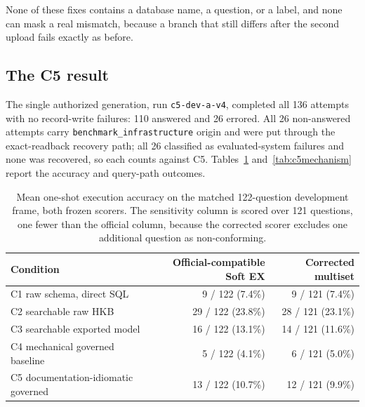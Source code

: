 None of these fixes contains a database name, a question, or a label, and none
can mask a real mismatch, because a branch that still differs after the second
upload fails exactly as before.

\subsection{The C5 result}
The single authorized generation, run \texttt{c5-dev-a-v4}, completed all 136
attempts with no record-write failures: 110 answered and 26 errored. All 26
non-answered attempts carry \texttt{benchmark\_infrastructure} origin and were
put through the exact-readback recovery path; all 26 classified as evaluated-system
failures and none was recovered, so each counts against C5.
Tables~\ref{tab:c5accuracy} and~\ref{tab:c5mechanism} report the accuracy and
query-path outcomes.

\begin{table}[htbp]
\centering
\caption{Mean one-shot execution accuracy on the matched 122-question development
frame, both frozen scorers. The sensitivity column is scored over 121 questions,
one fewer than the official column, because the corrected scorer excludes one
additional question as non-conforming.}
\label{tab:c5accuracy}
\begin{tabular}{lrr}
\toprule
Condition & Official-compatible Soft EX & Corrected multiset \\
\midrule
C1 raw schema, direct SQL & 9 / 122 (7.4\%) & 9 / 121 (7.4\%) \\
C2 searchable raw HKB & 29 / 122 (23.8\%) & 28 / 121 (23.1\%) \\
C3 searchable exported model & 16 / 122 (13.1\%) & 14 / 121 (11.6\%) \\
C4 mechanical governed baseline & 5 / 122 (4.1\%) & 6 / 121 (5.0\%) \\
C5 documentation-idiomatic governed & 13 / 122 (10.7\%) & 12 / 121 (9.9\%) \\
\bottomrule
\end{tabular}
\end{table}

